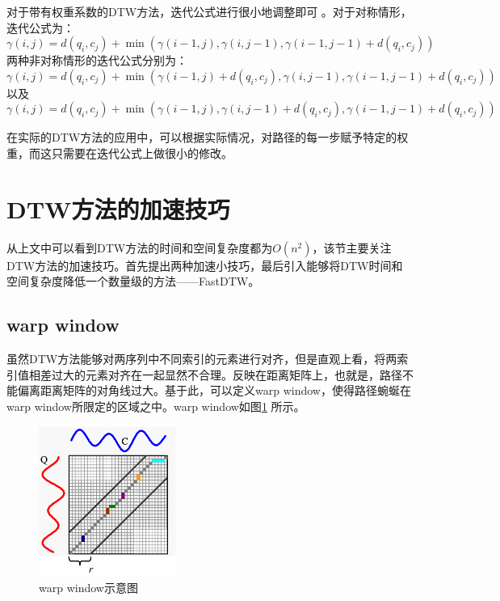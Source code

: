 对于带有权重系数的DTW方法，迭代公式进行很小地调整即可 。对于对称情形，迭代公式为：
\begin{equation}\label{equ:6}
  \gamma(i,j)=d(q_i,c_j)+\min \left( {\gamma \left( {i - 1,j} \right),\gamma \left( {i,j - 1} \right),\gamma \left( {i - 1,j - 1} \right)}+ d(q_i,c_j) \right)
\end{equation}
两种非对称情形的迭代公式分别为：
\begin{equation}\label{equ:7}
  \gamma (i,j) = d({q_i},{c_j}) + \min \left( {\gamma \left( {i - 1,j} \right) + d({q_i},{c_j}),\gamma \left( {i,j - 1} \right),\gamma \left( {i - 1,j - 1} \right) + d({q_i},{c_j})} \right)
\end{equation}
以及
\begin{equation}\label{equ:8}
  \gamma (i,j) = d({q_i},{c_j}) + \min \left( {\gamma \left( {i - 1,j} \right),\gamma \left( {i,j - 1} \right) + d({q_i},{c_j}),\gamma \left( {i - 1,j - 1} \right) + d({q_i},{c_j})} \right)
\end{equation}

在实际的DTW方法的应用中，可以根据实际情况，对路径的每一步赋予特定的权重，而这只需要在迭代公式上做很小的修改。

\section{DTW方法的加速技巧}
从上文中可以看到DTW方法的时间和空间复杂度都为$O(n^2)$，该节主要关注DTW方法的加速技巧。首先提出两种加速小技巧，最后引入能够将DTW时间和空间复杂度降低一个数量级的方法——FastDTW\cite{Salvador2007}。
\subsection{warp window}
虽然DTW方法能够对两序列中不同索引的元素进行对齐，但是直观上看，将两索引值相差过大的元素对齐在一起显然不合理。反映在距离矩阵上，也就是，路径不能偏离距离矩阵的对角线过大。基于此，可以定义warp window，使得路径蜿蜒在warp window所限定的区域之中。warp window如图\ref{fig:7} 所示。
\begin{figure}[h]
  \centering
  \includegraphics[width=0.4\textwidth]{./figure/warp_window.PNG}
  \caption{warp window示意图}\label{fig:7}
\end{figure}

